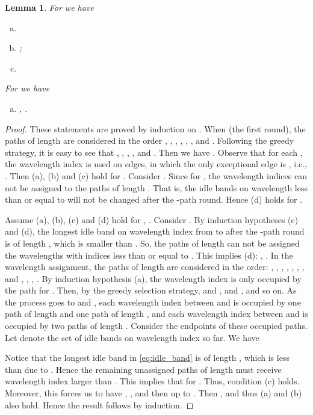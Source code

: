\documentclass[journal,draftcls,onecolumn,12pt,twoside]{IEEEtran}
\newtheorem{lemma}[theorem]{\bf Lemma}
\begin{document}
\begin{lemma}\label{lemma:GP_largelength}
For  we have
\begin{enumerate}[(a)]
\item 
\smallskip
\item ;
\smallskip
\item  \\ 

\end{enumerate}
For  we have
\begin{enumerate}[(d)]
\item , .
\end{enumerate}
\end{lemma}
\begin{proof}
These statements are proved by induction on .
When  (the first round), the paths of length  are considered in the order , , , , , ,  and .
Following the greedy strategy, it is easy to see that , , , ,  and .
Then we have .
Observe that for each , the wavelength index  is used on  edges, in which the only exceptional edge is , i.e., .
Then (a), (b) and (c) hold for .
Consider .
Since  for , the wavelength indices  can not be assigned to the paths of length .
That is, the idle bands on wavelength less than or equal to  will not be changed after the -path round.
Hence (d) holds for .

Assume (a), (b), (c) and (d) hold for , .
Consider .
By induction hypotheses (c) and (d), the longest idle band on wavelength index from  to  after the -path round is of length , which is smaller than .
So, the paths of length  can not be assigned the wavelengths with indices less than or equal to . 
This implies (d): , .
In the wavelength assignment, the paths of length  are considered in the order: , , , , , , , and , , , .
By induction hypothesis (a), the wavelength index  is only occupied by the path  for .
Then, by the greedy selection strategy,  and ,  and , and so on.
As the process goes to  and , 
each wavelength index between  and  is occupied by one path of length  and one path of length , and each wavelength index between  and  is occupied by two paths of length .
Consider the endpoints of these occupied paths.
Let  denote the set of idle bands on wavelength index  so far.
We have

Notice that the longest idle band in \eqref{eq:idle_band} is of length , which is less than  due to .
Hence the remaining unassigned paths of length  must receive wavelength index larger than .
This implies that  for .
Thus, condition (c) holds.
Moreover, this forces us to have , , and then up to .
Then , and thus (a) and (b) also hold.
Hence the result follows by induction.
\end{proof}
\end{document}
